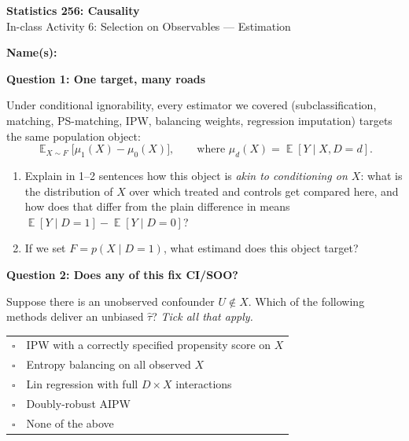 \documentclass[11pt]{article}
\DeclareMathOperator{\E}{\mathbb{E}}
\begin{document}
\begin{center}
{\Large \textbf{Statistics 256: Causality}} \\[6pt]
{\large In-class Activity 6: Selection on Observables --- Estimation}
\end{center}

\vspace{4pt}
\noindent\textbf{Name(s):} \hrulefill

\vspace{14pt}

\noindent\textbf{Question 1: One target, many roads}

\medskip
\noindent Under conditional ignorability, every estimator we covered (subclassification, matching, PS-matching, IPW, balancing weights, regression imputation) targets the same population object:
\[
  \E_{X \sim F}\bigl[\mu_1(X) - \mu_0(X)\bigr],
\qquad \text{where } \mu_d(X) = \E[Y \mid X, D{=}d].
\]

\begin{enumerate}[label=(\alph*)]
\item Explain in 1--2 sentences how this object is \textit{akin to conditioning on $X$}: what is the distribution of $X$ over which treated and controls get compared here, and how does that differ from the plain difference in means $\E[Y \mid D{=}1] - \E[Y \mid D{=}0]$?

\vspace{3.5cm}

\item If we set $F = p(X \mid D = 1)$, what estimand does this object target?

\vspace{1.8cm}
\end{enumerate}


\noindent\textbf{Question 2: Does any of this fix CI/SOO?}

\medskip
\noindent Suppose there is an unobserved confounder $U \notin X$. Which of the following methods deliver an unbiased $\widehat\tau$? \textit{Tick all that apply.}

\medskip
\begin{tabular}{p{0.4cm}l}
$\square$ & IPW with a correctly specified propensity score on $X$ \\
$\square$ & Entropy balancing on all observed $X$ \\
$\square$ & Lin regression with full $D \times X$ interactions \\
$\square$ & Doubly-robust AIPW \\
$\square$ & None of the above \\
\end{tabular}
\end{document}
